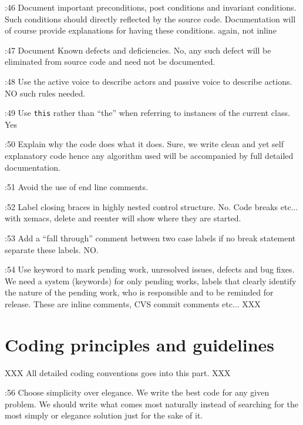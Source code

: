 \documentclass{book}
\newcommand{\name}[1]{\texttt{#1}}
\begin{document}
\cite{OKL_MisfeldtBumgardnerGray2004CppStyle}:46 Document important preconditions, post conditions and invariant conditions. Such conditions should directly reflected by the source code. Documentation will of course provide explanations for having these conditions. again, not inline

\cite{OKL_MisfeldtBumgardnerGray2004CppStyle}:47 Document Known defects and deficiencies. No, any such defect will be eliminated from source code and need not be documented. 

\cite{OKL_MisfeldtBumgardnerGray2004CppStyle}:48 Use the active voice to describe actors and passive voice to describe actions. NO such rules needed. 

\cite{OKL_MisfeldtBumgardnerGray2004CppStyle}:49 Use \name{this} rather than ``the'' when referring to instances of the current class. Yes

\cite{OKL_MisfeldtBumgardnerGray2004CppStyle}:50 Explain why the code does what it does. Sure, we write clean and yet self explanatory code hence any algorithm used will be accompanied by full detailed documentation.

\cite{OKL_MisfeldtBumgardnerGray2004CppStyle}:51 Avoid the use of end line comments. 

\cite{OKL_MisfeldtBumgardnerGray2004CppStyle}:52 Label closing braces in highly nested control structure. No. Code breaks etc... with xemacs, delete and reenter will show where they are started.

\cite{OKL_MisfeldtBumgardnerGray2004CppStyle}:53 Add a ``fall through'' comment between two case labels if no break statement separate these labels. NO.

\cite{OKL_MisfeldtBumgardnerGray2004CppStyle}:54 Use keyword to mark pending work, unresolved issues, defects and bug fixes.  We need a system (keywords) for only pending works, labels that clearly identify the nature of the pending work, who is responsible and to be reminded for release. These are inline comments, CVS commit comments etc... XXX





\part{Coding principles and guidelines}
\label{par:Programming}


XXX All detailed coding conventions goes into this part. XXX

\cite{OKL_MisfeldtBumgardnerGray2004CppStyle}:56 Choose simplicity over elegance. We write the best code for any given problem. We should write what comes most naturally instead of searching for the most simply or elegance solution just for the sake of it. 
\end{document}
